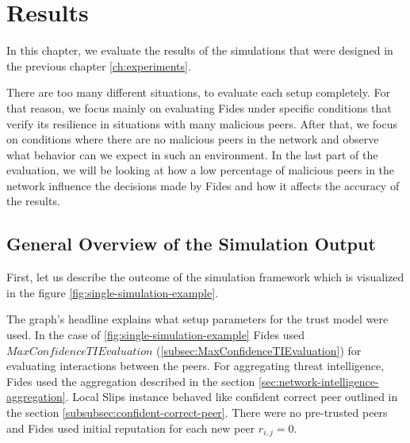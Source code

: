 \chapter{Results}
\label{ch:results}

In this chapter, we evaluate the results of the simulations that were designed in the previous chapter \ref{ch:experiments}.

There are too many different situations, to evaluate each setup completely.
For that reason, we focus mainly on evaluating Fides under specific conditions that verify its resilience in situations with many malicious peers.
After that, we focus on conditions where there are no malicious peers in the network and observe what behavior can we expect in such an environment.
In the last part of the evaluation, we will be looking at how a low percentage of malicious peers in the network influence the decisions made by Fides and how it affects the accuracy of the results.

\section{General Overview of the Simulation Output}
First, let us describe the outcome of the simulation framework which is visualized in the figure \ref{fig:single-simulation-example}.

The graph's headline explains what setup parameters for the trust model were used. In the case of \ref{fig:single-simulation-example} Fides used $MaxConfidenceTIEvaluation$ (\ref{subsec:MaxConfidenceTIEvaluation}) for evaluating interactions between the peers.
For aggregating threat intelligence, Fides used the aggregation described in the section \ref{sec:network-intelligence-aggregation}.
Local Slips instance behaved like confident correct peer outlined in the section  \ref{subsubsec:confident-correct-peer}.
There were no pre-trusted peers and Fides used initial reputation for each new peer $r_{i, j} = 0$.

